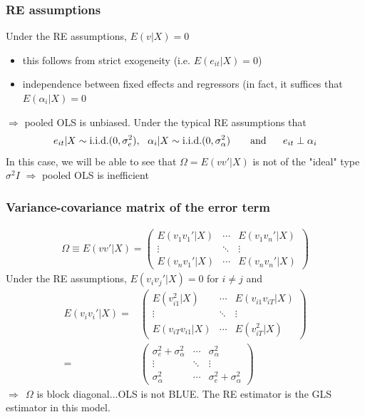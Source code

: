 \documentclass[a4paper,twoside,11pt]{article}
\begin{document}
\subsubsection{RE assumptions}
Under the RE assumptions, $E(v|X)=0$ 
\begin{itemize}
    \item this follows from strict exogeneity (i.e. $E(e_{it}|X)=0$)
    \item independence between fixed effects and regressors (in fact, it suffices that $E(\alpha_i|X)=0$
\end{itemize}
\textcolor{NavyBlue}{$\Rightarrow$ pooled OLS is unbiased.} 
\newline
\newline
Under the typical RE assumptions that
\begin{equation*}
\begin{aligned}
e_{it}|X \sim \textmd{i.i.d.} (0, \sigma_e^2) , \ \ \alpha_i|X \sim \textmd{i.i.d.}(0, \sigma_\alpha^2) \ \ \ \ \ \ \textmd{and} \ \ \ \ \ e_{it} \perp \alpha_i
\end{aligned} 
\end{equation*}
In this case, we will be able to see that $\Omega = E(vv'|X)$ is not of the "ideal" type $\sigma^2 I$ 
\newline
\textcolor{NavyBlue}{$\Rightarrow$ pooled OLS is inefficient}
\subsubsection{Variance-covariance matrix of the error term}
\begin{equation*}
\begin{aligned}
\Omega \equiv E(vv'|X) = \begin{pmatrix}
E(v_1 v_1'|X) & \cdots & E(v_1 v_n'|X) \\
\vdots & \ddots & \vdots \\
E(v_n v_1' |X) & \cdots & E(v_n v_n'|X)
\end{pmatrix}
\end{aligned} 
\end{equation*}
Under the RE assumptions, $E(v_i v_j'|X)=0$ for $i \ne j$ and 
\begin{equation*}
\begin{aligned}
E(v_i v_i'|X) =& \begin{pmatrix}
E(v_{i1}^2|X) & \cdots & E(v_{i1}v_{iT}|X) \\
\vdots & \ddots & \vdots \\
E(v_{iT}v_{i1}|X) & \cdots & E(v_{iT}^2|X)
\end{pmatrix} \\
=& \begin{pmatrix}
\sigma_e^2 + \sigma_\alpha^2 & \cdots & \sigma_\alpha^2 \\
\vdots & \ddots & \vdots \\
\sigma_\alpha^2 & \cdots & \sigma_e^2 + \sigma_\alpha^2
\end{pmatrix}
\end{aligned} 
\end{equation*}
$\Rightarrow \ \ \Omega$ is block diagonal...OLS is not BLUE. 
\newline
\textcolor{NavyBlue}{The RE estimator is the GLS estimator in this model.}
\end{document}
